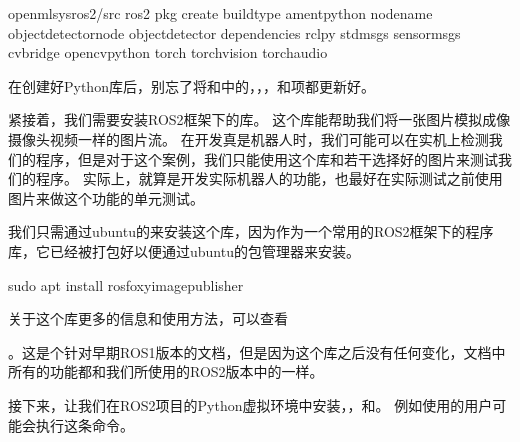 \documentclass[letterpaper,10pt,english]{sphinxmanual}
\begin{document}
\begin{sphinxVerbatim}[commandchars=\\\{\}]
 openmlsys\PYGZhy{}ros2/src
ros2 pkg create \PYGZhy{}\PYGZhy{}build\PYGZhy{}type ament\PYGZus{}python \PYGZhy{}\PYGZhy{}node\PYGZhy{}name object\PYGZus{}detector\PYGZus{}node object\PYGZus{}detector \PYGZhy{}\PYGZhy{}dependencies rclpy std\PYGZus{}msgs sensor\PYGZus{}msgs cv\PYGZus{}bridge opencv\PYGZhy{}python torch torchvision torchaudio
\end{sphinxVerbatim}

\sphinxAtStartPar
在创建好Python库后，别忘了将和中的，，，和项都更新好。

\sphinxAtStartPar
紧接着，我们需要安装ROS2框架下的库。
这个库能帮助我们将一张图片模拟成像摄像头视频一样的图片流。
在开发真是机器人时，我们可能可以在实机上检测我们的程序，但是对于这个案例，我们只能使用这个库和若干选择好的图片来测试我们的程序。
实际上，就算是开发实际机器人的功能，也最好在实际测试之前使用图片来做这个功能的单元测试。

\sphinxAtStartPar
我们只需通过ubuntu的来安装这个库，因为作为一个常用的ROS2框架下的程序库，它已经被打包好以便通过ubuntu的包管理器来安装。

\begin{sphinxVerbatim}[commandchars=\\\{\}]
sudo apt install ros\PYGZhy{}foxy\PYGZhy{}image\PYGZhy{}publisher
\end{sphinxVerbatim}

\sphinxAtStartPar
关于这个库更多的信息和使用方法，可以查看%
\begin{footnote}[95]\sphinxAtStartFootnote
{}
%
\end{footnote}。这是个针对早期ROS1版本的文档，但是因为这个库之后没有任何变化，文档中所有的功能都和我们所使用的ROS2版本中的一样。

\sphinxAtStartPar
接下来，让我们在ROS2项目的Python虚拟环境中安装，，和。
例如使用的用户可能会执行这条命令。
\end{document}
